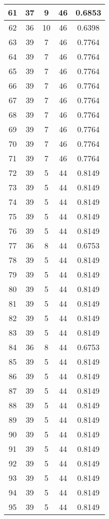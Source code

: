 \documentclass[letterpaper, 12pt]{article}
\begin{document}
\begin{longtable}{|c|c|c|c|c|}
61 & 37 & 9 & 46 & 0.6853 \\
\hline
62 & 36 & 10 & 46 & 0.6398 \\
\hline
63 & 39 & 7 & 46 & 0.7764 \\
\hline
64 & 39 & 7 & 46 & 0.7764 \\
\hline
65 & 39 & 7 & 46 & 0.7764 \\
\hline
66 & 39 & 7 & 46 & 0.7764 \\
\hline
67 & 39 & 7 & 46 & 0.7764 \\
\hline
68 & 39 & 7 & 46 & 0.7764 \\
\hline
69 & 39 & 7 & 46 & 0.7764 \\
\hline
70 & 39 & 7 & 46 & 0.7764 \\
\hline
71 & 39 & 7 & 46 & 0.7764 \\
\hline
72 & 39 & 5 & 44 & 0.8149 \\
\hline
73 & 39 & 5 & 44 & 0.8149 \\
\hline
74 & 39 & 5 & 44 & 0.8149 \\
\hline
75 & 39 & 5 & 44 & 0.8149 \\
\hline
76 & 39 & 5 & 44 & 0.8149 \\
\hline
77 & 36 & 8 & 44 & 0.6753 \\
\hline
78 & 39 & 5 & 44 & 0.8149 \\
\hline
79 & 39 & 5 & 44 & 0.8149 \\
\hline
80 & 39 & 5 & 44 & 0.8149 \\
\hline
81 & 39 & 5 & 44 & 0.8149 \\
\hline
82 & 39 & 5 & 44 & 0.8149 \\
\hline
83 & 39 & 5 & 44 & 0.8149 \\
\hline
84 & 36 & 8 & 44 & 0.6753 \\
\hline
85 & 39 & 5 & 44 & 0.8149 \\
\hline
86 & 39 & 5 & 44 & 0.8149 \\
\hline
87 & 39 & 5 & 44 & 0.8149 \\
\hline
88 & 39 & 5 & 44 & 0.8149 \\
\hline
89 & 39 & 5 & 44 & 0.8149 \\
\hline
90 & 39 & 5 & 44 & 0.8149 \\
\hline
91 & 39 & 5 & 44 & 0.8149 \\
\hline
92 & 39 & 5 & 44 & 0.8149 \\
\hline
93 & 39 & 5 & 44 & 0.8149 \\
\hline
94 & 39 & 5 & 44 & 0.8149 \\
\hline
95 & 39 & 5 & 44 & 0.8149 \\

\end{longtable}
\end{document}
